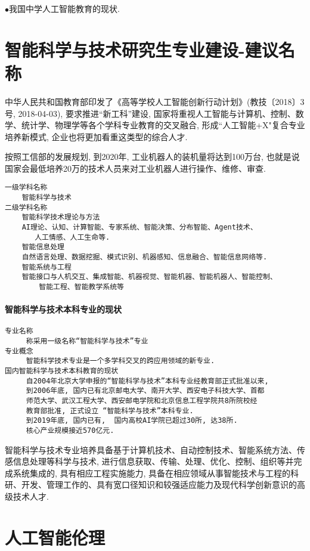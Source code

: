 $\bullet$我国中学人工智能教育的现状.
\section{智能科学与技术研究生专业建设-建议名称}
中华人民共和国教育部印发了《高等学校人工智能创新行动计划》(教技〔2018〕3号,  2018-04-03), 要求推进“新工科”建设,
国家将重视人工智能与计算机、控制、数学、统计学、物理学等各个学科专业教育的交叉融合, 形成``人工智能+X"复合专业培养新模式, 企业也将更加看重这类型的综合人才.

按照工信部的发展规划, 到2020年, 工业机器人的装机量将达到100万台, 也就是说国家会最低培养20万的技术人员来对工业机器人进行操作、维修、审查.
\begin{Verbatim}
一级学科名称
    智能科学与技术
二级学科名称
    智能科学技术理论与方法
    AI理论、认知、计算智能、专家系统、智能决策、分布智能、Agent技术、
       人工情感、人工生命等.
    智能信息处理
    自然语言处理、数据挖掘、模式识别、机器感知、信息融合、智能信息网络等.
    智能系统与工程
    智能接口与人机交互、集成智能、机器视觉、智能机器、智能机器人、智能控制、
        智能工程、智能教学系统等
\end{Verbatim}
\paragraph{智能科学与技术本科专业的现状}
\begin{Verbatim}
专业名称
     称采用一级名称“智能科学与技术”专业
专业概念
     智能科学技术专业是一个多学科交叉的跨应用领域的新专业.
国内智能科学与技术本科教育的现状
     自2004年北京大学申报的“智能科学与技术”本科专业经教育部正式批准以来,
     到2006年底, 国内已有北京邮电大学、南开大学、西安电子科技大学、首都
     师范大学、武汉工程大学、西安邮电学院和北京信息工程学院共8所院校经
     教育部批准, 正式设立 “智能科学与技术”本科专业.
     到2019年底, 国内已有,  国内高校AI学院已超过30所, 达38所.
     核心产业规模接近570亿元.
\end{Verbatim}

智能科学与技术专业培养具备基于计算机技术、自动控制技术、智能系统方法、传感信息处理等科学与技术, 进行信息获取、传输、处理、优化、控制、组织等并完成系统集成的, 具有相应工程实施能力,
具备在相应领域从事智能技术与工程的科研、开发、管理工作的、具有宽口径知识和较强适应能力及现代科学创新意识的高级技术人才.
\section{人工智能伦理}

